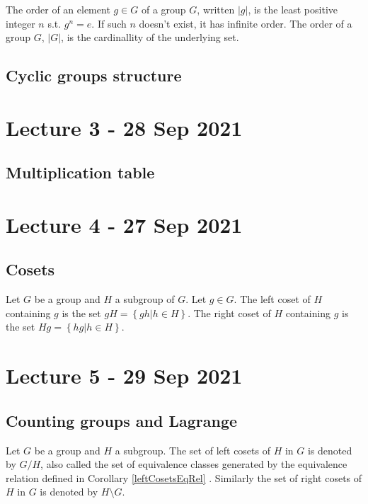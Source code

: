 \documentclass[11pt]{scrartcl}
\begin{document}
\begin{definition}
  The order of an element $g\in G$ of a group $G$, written $|g|$, is the least positive
  integer $n$ s.t. $g^n=e$. If such $n$ doesn't exist, it has infinite order. The order
  of a group $G$, $|G|$, is the cardinallity of the underlying set.
  \label{orderGroup}
\end{definition}

\subsection{Cyclic groups structure}

\section{Lecture 3 - 28 Sep 2021}

\subsection{Multiplication table}

\section{Lecture 4 - 27 Sep 2021}

\subsection{Cosets}

\begin{definition}
  Let $G$ be a group and $H$ a subgroup of $G$. Let $g\in G$. The left coset of $H$
  containing $g$ is the set $gH=\left\{ gh | h\in H \right\}$. The right coset of $H$
  containing $g$ is the set $Hg=\left\{ hg | h\in H \right\}$.
  \label{coset}
\end{definition}

\section{Lecture 5 - 29 Sep 2021}

\subsection{Counting groups and Lagrange}

\begin{definition}
  Let $G$ be a group and $H$ a subgroup. The set of left cosets of $H$ in $G$ is denoted
  by $G/H$, also called the set of equivalence classes generated by the equivalence
  relation defined in Corollary \ref{leftCosetsEqRel} . Similarly the set of right cosets of
  $H$ in $G$ is denoted by $H\setminus G$.
  \label{cosets}
\end{definition}
\end{document}
